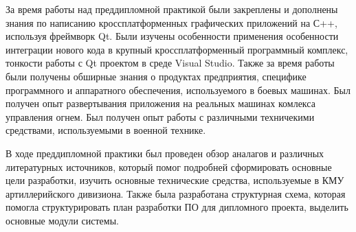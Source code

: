 
За время работы над преддипломной практикой были закреплены и дополнены знания по написанию кроссплатформенных
графических приложений на С++, используя фреймворк Qt.
Были изучены особенности применения особенности интеграции нового кода в крупный кроссплатформенный программный
комплекс, тонкости работы с Qt проектом в среде Visual Studio.
Также за время работы были получены обширные знания о продуктах предприятия, специфике программного и аппаратного
обеспечения, используемого в боевых машинах.
Был получен опыт развертывания приложения на реальных машинах комлекса управления огнем.
Был получен опыт работы с различными техничекими средствами, используемыми в военной технике.

В ходе преддипломной практики был проведен обзор аналагов и различных литературных источников, который помог подробней
сформировать основные цели разработки, изучить основные технические средства, используемые в КМУ артиллерийского
дивизиона.
Также была разработана структурная схема, которая помогла структурировать план разработки ПО для дипломного проекта,
выделить основные модули системы.
